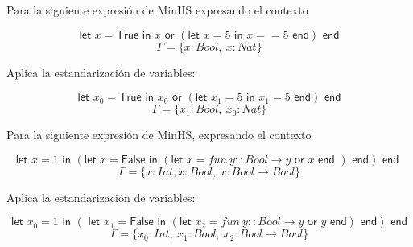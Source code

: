 \begin{exercise}    
    Para la siguiente expresión de \textsf{MinHS} expresando el contexto

    $$ \textsf{let } x = \textsf{True} \textsf{ in } x \textsf{ or } (\textsf{let } x = 5 \textsf{ in } x == 5 \textsf{ end}) \textsf{ end} $$
    $$ \Gamma = \{x:Bool,\ x:Nat\}$$
    
    Aplica la estandarización de variables: 
    
    $$ \textsf{let } x_0 = \textsf{True} \textsf{ in } x_0 \textsf{ or } (\textsf{let } x_1 = 5 \textsf{ in } x_1 = 5 \textsf{ end}) \textsf{ end} $$
    $$ \Gamma = \{x_1:Bool,\ x_0:Nat\}$$
\end{exercise}

\begin{exercise}    
    Para la siguiente expresión de \textsf{MinHS}, expresando el contexto
    
    $$ \textsf{let } x = 1 \textsf{ in } (\textsf{let } x = \textsf{False} \textsf{ in } (\textsf{let } x = fun\ y :: Bool \to y  \textsf{ or } x \textsf{ end }) \textsf{ end}) \textsf{ end }$$
    $$ \Gamma = \{ x : Int, x : Bool,\ x : Bool \to Bool \}$$
    
    Aplica la estandarización de variables:
    
    $$ \textsf{let } x_0 = 1 \textsf{ in } (\textsf{ let } x_1 = \textsf{False} \textsf{ in } (\textsf{let } x_2 = fun\ y :: Bool \to y  \textsf{ or } y \textsf{ end}) \textsf{ end}) \textsf{ end} $$
    $$ \Gamma = \{ x_0 : Int,\ x_1 : Bool,\ x_2 : Bool \to Bool \}$$
\end{exercise}

